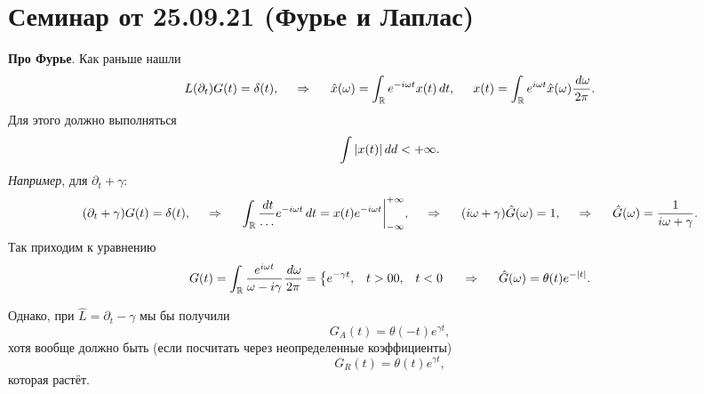 
\section{Семинар от 25.09.21 (Фурье и Лаплас)}

\textbf{Про Фурье}. 
Как раньше нашли
\begin{equation*}
    L(\partial_t) G(t) = \delta(t),
    \hspace{0.5cm} \Rightarrow \hspace{0.5cm}
    \hat{x} (\omega) = \int_{\mathbb{R}} e^{- i \omega t} x(t) \, d t,
    \hspace{5 mm} 
    x(t) = \int_{\mathbb{R}} e^{i \omega t} \hat{x}(\omega) \frac{\, d \omega}{2\pi}.
\end{equation*}
Для этого должно выполняться
\begin{equation*}
    \int |x(t)| \, d d < + \infty.
\end{equation*}
\textit{Например}, для $\partial_t + \gamma$:
\begin{equation*}
    (\partial_t + \gamma) G(t) = \delta(t),
    \hspace{0.5cm} \Rightarrow \hspace{0.5cm}
    \int_{\mathbb{R}} \frac{\, d t}{\ldots} e^{- i \omega t} \, d t = x(t) e^{- i \omega t} \bigg|_{-\infty}^{+\infty},
    \hspace{0.5cm} \Rightarrow \hspace{0.5cm}
    (i \omega + \gamma) \hat{G} (\omega) = 1,
    \hspace{0.5cm} \Rightarrow \hspace{0.5cm}
    \hat{G}(\omega) = \frac{1}{i \omega + \gamma}.
\end{equation*}
Так приходим к уравнению
\begin{equation*}
    G(t) = \int_{\mathbb{R}} \frac{e^{i \omega t}}{\omega - i \gamma} \frac{\, d \omega}{2\pi} = 
    \left\{\begin{aligned}
        &e^{- \gamma t}, &t > 0
        &0, &t<0
    \end{aligned}\right.
    \hspace{0.5cm} \Rightarrow \hspace{0.5cm}
    \hat{G}(\omega) = \theta(t) e^{- |t|}.
\end{equation*}

Однако, при $\hat{L} = \partial_t - \gamma$ мы бы получили
\begin{equation*}
    G_A (t) = \theta(-t) e^{\gamma t}, 
\end{equation*}
хотя вообще должно быть (если посчитать через неопределенные коэффициенты)
\begin{equation*}
    G_R (t) = \theta(t) e^{\gamma t},
\end{equation*}
которая растёт.


